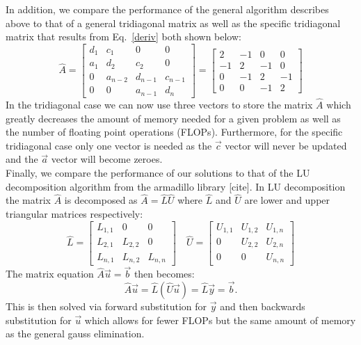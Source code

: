 \documentclass[prc,amsmath,twocolumn,superscriptaddress]{revtex4}
\begin{document}
In addition, we compare the performance of the general algorithm describes above to that of a general tridiagonal matrix as well as the specific tridiagonal matrix that results from Eq.~\ref{deriv} both shown below:
\begin{equation}
\hat{A}=\begin{bmatrix} d_{1} & c_{1} &0&0\\ a_{1}  & d_{2} &c_{2}&0 \\ 0  & a_{n-2}  &d_{n-1}&c_{n-1} \\ 0  &0& a_{n-1}  &d_{n} \end{bmatrix}=
\begin{bmatrix} 2 & -1&0&0\\ -1  & 2 &-1&0 \\ 0  & -1  &2&-1 \\ 0  &0& -1  &2 \end{bmatrix}
\end{equation}
\indent In the tridiagonal case we can now use three vectors to store the matrix $\hat{A}$ which greatly decreases the amount of memory needed for a given problem as well as the number of floating point operations (FLOPs). Furthermore, for the specific tridiagonal case only one vector is needed as the $\vec{c}$ vector will never be updated and the $\vec{a}$ vector will become zeroes. \\

Finally, we compare the performance of our solutions to that of the LU decomposition algorithm from the armadillo library [cite]. In LU decomposition the matrix $\hat{A}$ is decomposed as $\hat{A}=\hat{L}\hat{U}$ where $\hat{L}$ and $\hat{U}$ are lower and upper triangular matrices respectively:
\begin{equation}
\hat{L}=\begin{bmatrix} L_{1,1} & 0&0 \\ L_{2,1}  & L_{2,2} &0 \\ L_{n,1}  & L_{n,2}  &L_{n,n}\end{bmatrix} \quad
\hat{U}=\begin{bmatrix} U_{1,1} & U_{1,2}& U_{1,n}\\ 0  & U_{2,2} &U_{2,n} \\ 0  & 0  &U_{n,n}\end{bmatrix} 
\end{equation}
The matrix equation $\hat{A}\vec{u}=\vec{b}$ then becomes:
\begin{equation}
\hat{A}\vec{u}=\hat{L}(\hat{U}\vec{u})=\hat{L}\vec{y}=\vec{b}.
\end{equation}
This is then solved via forward substitution for $\vec{y}$ and then backwards substitution for $\vec{u}$ which allows for fewer FLOPs but the same amount of memory as the general gauss elimination.
\end{document}
